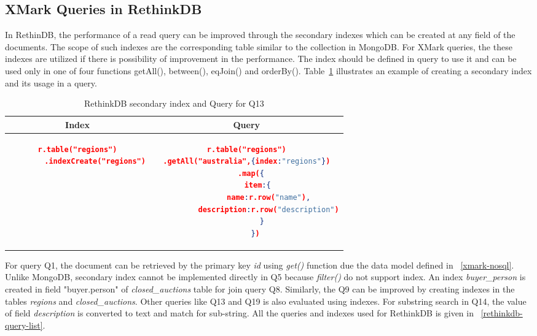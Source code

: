 \subsection{XMark Queries in RethinkDB}
In RethinDB, the performance of a read query can be improved through the secondary indexes which can be created at any field of the documents. The scope of such indexes are the corresponding table similar to the collection in MongoDB. For XMark queries, the these indexes are utilized if there is possibility of improvement in the performance. The index should be defined in query to use it and can be used only in one of four functions getAll(), between(), eqJoin() and orderBy(). Table~\ref{tbl:rethinkdb-index-query} illustrates an example of creating a secondary index and its usage in a query.
\begin{longtable}{c|c}
	\caption{ RethinkDB secondary index and Query for Q13}
	\label{tbl:rethinkdb-index-query}\\
    {Index} & {Query}\\
	\hline
\begin{minipage}{.3\textwidth}
\begin{lstlisting}[language=JSON,basicstyle=\scriptsize]
    r.table("regions")
        .indexCreate("regions")
\end{lstlisting}
\end{minipage} &
\begin{minipage}{.5\textwidth}
\begin{lstlisting}[language=JSON,basicstyle=\scriptsize]
r.table("regions")
.getAll("australia",{index:"regions"})
    .map({  
       item:{  
          name:r.row("name"),
          description:r.row("description")
       }
    })
\end{lstlisting}
\end{minipage}
\end{longtable}

For query Q1, the document can be retrieved by the primary key \textit{id} using \textit{get()} function due the data model defined in ~\ref{xmark-nosql}. Unlike MongoDB, secondary index cannot be implemented directly in Q5 because \textit{filter()} do not support index. An index \textit{buyer\_person} is created in field "buyer.person" of \textit{closed\_auctions} table for join query Q8. Similarly, the Q9 can be improved by creating indexes in the tables \textit{regions} and \textit{closed\_auctions}. Other queries like Q13 and Q19 is also evaluated using indexes. For substring search in Q14, the value of  field \textit{description} is converted to text and match for sub-string. All the queries and indexes used for RethinkDB is given in ~\ref{rethinkdb-query-list}.

